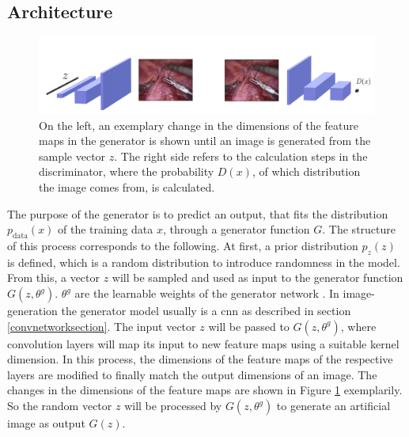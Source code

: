 \subsection{Architecture}
\begin{figure}[!b]
    \begin{center}
     \includegraphics[width=15cm]{./images/gan_conv_image.png}
    \caption[GAN image generation.]{{On the left, an exemplary change in the dimensions of the feature maps in the generator is shown until an image is generated from the sample vector $z$.
        The right side refers to the calculation steps in the discriminator, where the probability $D(x)$, of which distribution the image comes from, is calculated.}\label{gan_conv_image}}
    \end{center}
\end{figure}
The purpose of the generator is to predict an output, that fits the distribution $p_{\text{data}}(x)$ of the training data $x$, through a generator function $G$.
The structure of this process corresponds to the following.
At first, a prior distribution $p_z(z)$ is defined, which is a random distribution to introduce randomness in the model. 
From this, a vector $z$ will be sampled and used as input to the generator function $G(z, \theta^g)$.
$\theta^g$ are the learnable weights of the generator network \cite{Goodfellow2020}.
In image-generation the generator model usually is a \acs{cnn} as described in section \ref{convnetworksection}.
The input vector $z$ will be passed to $G(z, \theta^g)$, where convolution layers will map its input to new feature maps using a suitable kernel dimension.
In this process, the dimensions of the feature maps of the respective layers are modified to finally match the output dimensions of an image.
The changes in the dimensions of the feature maps are shown in Figure \ref{gan_conv_image} exemplarily.
So the random vector $z$ will be processed by $G(z, \theta^g)$ to generate an artificial image as output $G(z)$.\\


